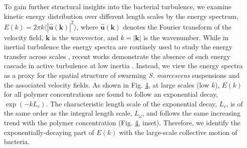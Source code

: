 \documentclass[aps,prl,floatfix,footinbib,twocolumn,superscriptaddress]{revtex4-1}
\begin{document}
To gain further structural insights into the bacterial turbulence, we examine kinetic energy distribution over different length scales by the energy spectrum, $E(k)=2\pi k\langle|\hat{\mathbf{u}}(\mathbf{k})|^2\rangle$, where $\hat{\mathbf{u}}(\mathbf{k})$ denotes the Fourier transform of the velocity field, $\mathbf{k}$ is the wavevector, and $k=\vert \mathbf{k}\vert$ is the wavenumber. While in inertial turbulence the energy spectra are routinely used to study the energy transfer across scales \cite{Frisch1995turbulence}, recent works demonstrate the absence of such energy cascade in active turbulence at low inertia \cite{Alert_NP_2020, Carenza_EPL_2020,Alert_Review_2022}. Instead, we view the energy spectra as a proxy for the spatial structure of swarming \textit{S. marcescens} suspensions and the associated velocity fields. As shown in Fig. \hyperref[fig4]{4}, at large scales (low $k$), $E(k)$ for all polymer concentrations are found to follow an exponential decay, $\exp(-kL_c)$. The characteristic length scale of the exponential decay, $L_c$, is of the same order as the integral length scale, $L_\omega$, and follows the same increasing trend with the polymer concentration (Fig. \hyperref[fig4]{4}, inset). Therefore, we identify the exponentially-decaying part of $E(k)$ with the large-scale collective motion of bacteria.

\end{document}
